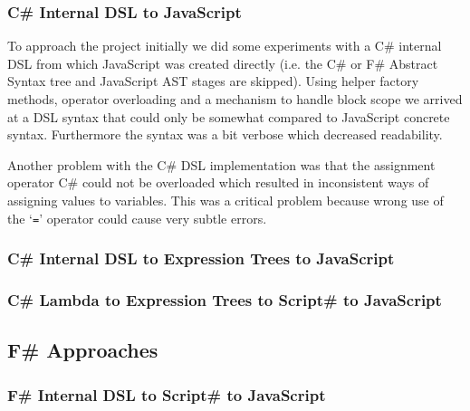 		\subsubsection{C\# Internal DSL to JavaScript} %
		\label{ssub:c_internal_dsl_to_javascript}
			To approach the project initially we did some experiments with a C\# internal DSL from which JavaScript was created directly (i.e. the C\# or F\# Abstract Syntax tree and JavaScript AST stages are skipped). Using helper factory methods, operator overloading and a mechanism to handle block scope we arrived at a DSL syntax that could only be somewhat compared to JavaScript concrete syntax. Furthermore the syntax was a bit verbose which decreased readability. 

			Another problem with the C\# DSL implementation was that the assignment operator C\# could not be overloaded which resulted in inconsistent ways of assigning values to variables. This was a critical problem because wrong use of the ‘\texttt{=}’ operator could cause very subtle errors.


		\subsubsection{C\# Internal DSL to Expression Trees to JavaScript} %
		\label{ssub:c_internal_dsl_to_expression_trees_to_javascript}
		

		\subsubsection{C\# Lambda to Expression Trees to Script\# to JavaScript} %
		\label{ssub:c_lambda_to_expression_trees_to_script_to_javascript}
		


	\subsection{F\# Approaches} %
	\label{sub:f_approaches}
	
		\subsubsection{F\# Internal DSL to Script\# to JavaScript} %
		\label{ssub:f_internal_dsl_to_script_to_javascript}
		
